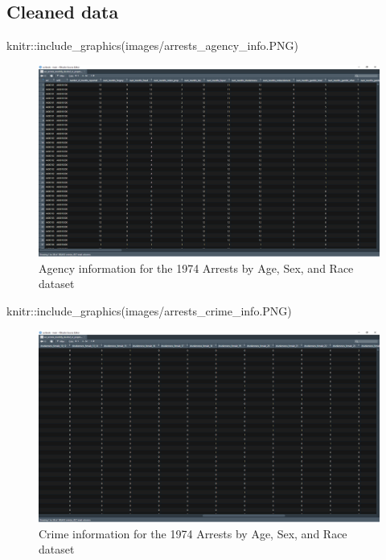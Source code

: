 \documentclass[
  12pt,
  openany]{book}
\newenvironment{Shaded}{\begin{snugshade}}{\end{snugshade}}
\newcommand{\FunctionTok}[1]{\textcolor[rgb]{0,0,0}{#1}}
\newcommand{\NormalTok}[1]{#1}
\newcommand{\SpecialCharTok}[1]{\textcolor[rgb]{0,0,0}{#1}}
\newcommand{\StringTok}[1]{\textcolor[rgb]{0.5,0.5,0.5}{#1}}
\begin{document}
\hypertarget{cleaned-data-1}{%
\subsection{Cleaned data}\label{cleaned-data-1}}

\begin{Shaded}
\begin{Highlighting}[]
\NormalTok{knitr}\SpecialCharTok{::}\FunctionTok{include\_graphics}\NormalTok{(}\StringTok{\textquotesingle{}images/arrests\_agency\_info.PNG\textquotesingle{}}\NormalTok{)}
\end{Highlighting}
\end{Shaded}

\begin{figure}
\includegraphics[width=26.67in]{images/arrests_agency_info} \caption{Agency information for the 1974 Arrests by Age, Sex, and Race dataset}\label{fig:unnamed-chunk-2}
\end{figure}

\begin{Shaded}
\begin{Highlighting}[]
\NormalTok{knitr}\SpecialCharTok{::}\FunctionTok{include\_graphics}\NormalTok{(}\StringTok{\textquotesingle{}images/arrests\_crime\_info.PNG\textquotesingle{}}\NormalTok{)}
\end{Highlighting}
\end{Shaded}

\begin{figure}
\includegraphics[width=26.67in]{images/arrests_crime_info} \caption{Crime information for the 1974 Arrests by Age, Sex, and Race dataset}\label{fig:unnamed-chunk-3}
\end{figure}
\end{document}
